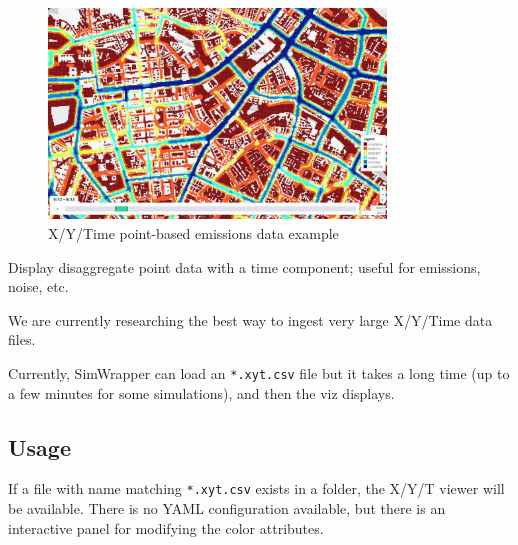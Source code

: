 \begin{figure}[H]
  \centering
  \includegraphics[width=0.8\textwidth]{assets/xyt-emissions.jpg}
  \caption{X/Y/Time point-based emissions data example}
\end{figure}

Display disaggregate point data with a time component; useful for
emissions, noise, etc.

We are currently researching the best way to ingest very large
X/Y/Time data files.

Currently, SimWrapper can load an \texttt{*.xyt.csv} file
but it takes a long time (up to a few minutes for some simulations), and
then the viz displays.

\hypertarget{usage}{%
\subsection{Usage}}

If a file with name matching \texttt{*.xyt.csv} exists in a folder, the
X/Y/T viewer will be available. There is no YAML configuration
available, but there is an interactive panel for modifying the color
attributes.
